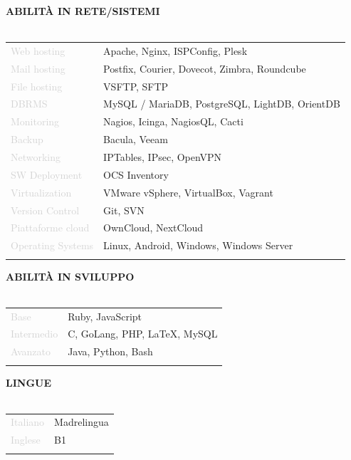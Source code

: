 \documentclass{article}
\begin{document}
\textbf{\textcolor{deepblue}{ABILIT\`A IN RETE/SISTEMI}} \\\\ \hfill
\begin{tabular}{ R{4cm} l }
	\textcolor{lightgray}{Web hosting}       & Apache, Nginx, ISPConfig, Plesk                  \\ \hfill
	\textcolor{lightgray}{Mail hosting}      & Postfix, Courier, Dovecot, Zimbra, Roundcube     \\ \hfill
	\textcolor{lightgray}{File hosting}      & VSFTP, SFTP                                      \\ \hfill
	\textcolor{lightgray}{DBRMS}             & MySQL / MariaDB, PostgreSQL, LightDB, OrientDB   \\ \hfill
	\textcolor{lightgray}{Monitoring}        & Nagios, Icinga, NagiosQL, Cacti                  \\ \hfill
	\textcolor{lightgray}{Backup}            & Bacula, Veeam                                    \\ \hfill
	\textcolor{lightgray}{Networking}        & IPTables, IPsec, OpenVPN                         \\ \hfill
	\textcolor{lightgray}{SW Deployment}     & OCS Inventory                                    \\ \hfill
	\textcolor{lightgray}{Virtualization}    & VMware vSphere, VirtualBox, Vagrant              \\ \hfill
	\textcolor{lightgray}{Version Control}   & Git, SVN                                         \\ \hfill
	\textcolor{lightgray}{Piattaforme cloud} & OwnCloud, NextCloud                              \\ \hfill
	\textcolor{lightgray}{Operating Systems} & Linux, Android, Windows, Windows Server          \\ \hfill
\end{tabular}

\textbf{\textcolor{deepblue}{ABILIT\`A IN SVILUPPO}} \\\\ \hfill
\begin{tabular}{ R{4cm} l }
	\textcolor{lightgray}{Base}       & Ruby, JavaScript                \\ \hfill
	\textcolor{lightgray}{Intermedio} & C, GoLang, PHP, LaTeX, MySQL    \\ \hfill
	\textcolor{lightgray}{Avanzato}   & Java, Python, Bash              \\ \hfill
\end{tabular}

\textbf{\textcolor{deepblue}{LINGUE}} \\\\ \hfill
\begin{tabular}{ R{4cm} l }
	\textcolor{lightgray}{Italiano} & Madrelingua \\ \hfill
	\textcolor{lightgray}{Inglese}  & B1          \\ \hfill
\end{tabular}
\end{document}
